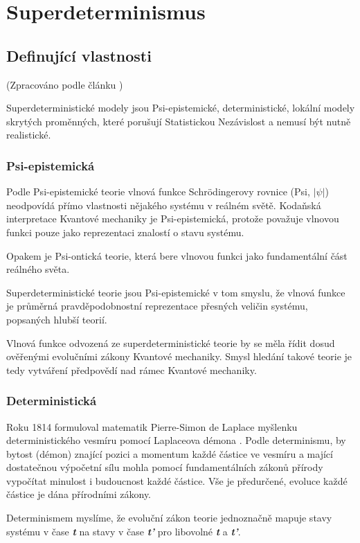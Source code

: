 \section{Superdeterminismus}
\subsection{Definující vlastnosti}
(Zpracováno podle článku \cite{supdet:rethink})

Superdeterministické modely jsou Psi-epistemické, deterministické, lokální modely skrytých proměnných, které porušují Statistickou Nezávislost a nemusí být nutně realistické.

\subsubsection{Psi-epistemická}
Podle Psi-epistemické teorie vlnová funkce Schrödingerovy rovnice (Psi, $|\psi|$) neodpovídá přímo vlastnosti nějakého systému v reálném světě. Kodaňská interpretace Kvantové mechaniky je Psi-epistemická, protože považuje vlnovou funkci pouze jako reprezentaci znalostí o stavu systému.

Opakem je Psi-ontická teorie, která bere vlnovou funkci jako fundamentální část reálného světa.

Superdeterministické teorie jsou Psi-epistemické v tom smyslu, že vlnová funkce je průměrná pravděpodobnostní reprezentace přesných veličin systému, popsaných hlubší teorií.

Vlnová funkce odvozená ze superdeterministické teorie by se měla řídit dosud ověřenými evolučními zákony Kvantové mechaniky. Smysl hledání takové teorie je tedy vytváření předpovědí nad rámec Kvantové mechaniky.

\subsubsection{Deterministická}
Roku 1814 formuloval matematik Pierre-Simon de Laplace myšlenku deterministického vesmíru pomocí Laplaceova démona \parencite{laplace:demon}. Podle determinismu, by bytost (démon) znající pozici a momentum každé částice ve vesmíru a mající dostatečnou výpočetní sílu mohla pomocí fundamentálních zákonů přírody vypočítat minulost i budoucnost každé částice. Vše je předurčené, evoluce každé částice je dána přírodními zákony.

Determinismem myslíme, že evoluční zákon teorie jednoznačně mapuje stavy systému v čase \textbf{\emph{t}} na stavy v čase \textbf{\emph{t'}} pro libovolné \textbf{\emph{t}} a \textbf{\emph{t'}}.

